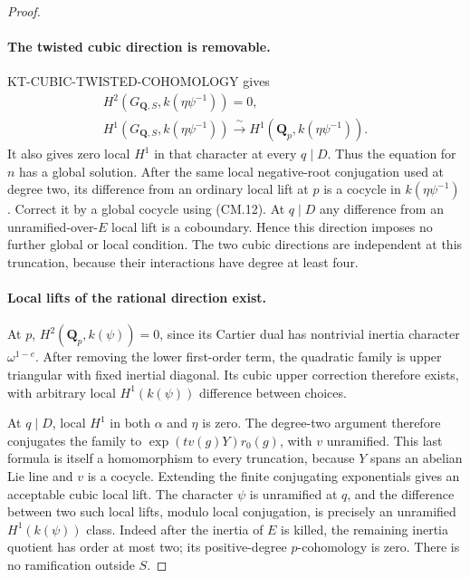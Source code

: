 \begin{proof}
\paragraph{The twisted cubic direction is removable.}
KT-CUBIC-TWISTED-COHOMOLOGY gives
\[
\begin{gathered}
 H^2(G_{\mathbf Q,S},k(\eta\psi^{-1}))=0,\\
 H^1(G_{\mathbf Q,S},k(\eta\psi^{-1}))
       \xrightarrow{\ \sim\ }H^1(\mathbf Q_p,k(\eta\psi^{-1})).
\end{gathered}                                                 \tag{CM.12}
\]
It also gives zero local $H^1$ in that character at every
$q\mid D$.  Thus the equation for $n$ has a global solution.
After the same local negative-root conjugation used at degree
two, its difference from an ordinary local lift at $p$ is a
cocycle in $k(\eta\psi^{-1})$.  Correct it by a global cocycle
using (CM.12).  At $q\mid D$ any difference from an
unramified-over-$E$ local lift is a coboundary.  Hence this
direction imposes no further global or local condition.
The two cubic directions are independent at this truncation,
because their interactions have degree at least four.

\paragraph{Local lifts of the rational direction exist.}
At $p$, $H^2(\mathbf Q_p,k(\psi))=0$, since its Cartier
dual has nontrivial inertia character $\omega^{1-e}$.
After removing the lower first-order term, the quadratic
family is upper triangular with fixed inertial diagonal.
Its cubic upper correction therefore exists, with arbitrary
local $H^1(k(\psi))$ difference between choices.

At $q\mid D$, local $H^1$ in both $\alpha$ and $\eta$ is
zero.  The degree-two argument therefore conjugates the
family to $\exp(t v(g)Y)r_0(g)$, with $v$ unramified.
This last formula is itself a homomorphism to every
truncation, because $Y$ spans an abelian Lie line and $v$
is a cocycle.  Extending the finite conjugating exponentials
gives an acceptable cubic local lift.  The character $\psi$
is unramified at $q$, and the difference between two such
local lifts, modulo local conjugation, is precisely an
unramified $H^1(k(\psi))$ class.  Indeed after the inertia
of $E$ is killed, the remaining inertia quotient has order
at most two; its positive-degree $p$-cohomology is zero.
There is no ramification outside $S$.


\end{proof}
